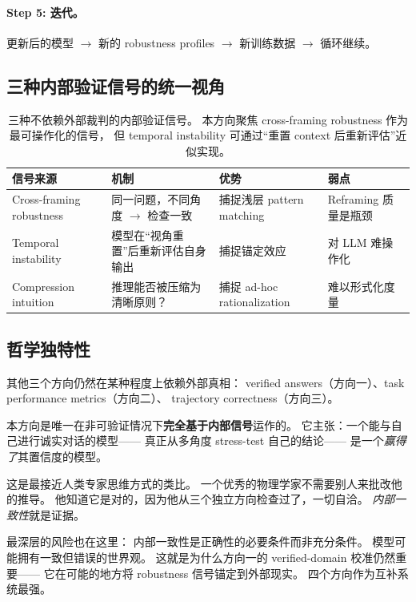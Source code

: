 \documentclass[12pt,a4paper]{article}
\begin{document}
\paragraph{Step 5: 迭代。}
更新后的模型 $\rightarrow$ 新的 robustness profiles
$\rightarrow$ 新训练数据 $\rightarrow$ 循环继续。

\subsection{三种内部验证信号的统一视角}

\begin{table}[h]
\centering
\small
\begin{tabular}{p{3cm}p{4cm}p{2.5cm}p{3cm}}
\toprule
\textbf{信号来源} & \textbf{机制} & \textbf{优势} & \textbf{弱点} \\
\midrule
Cross-framing robustness
  & 同一问题，不同角度 $\rightarrow$ 检查一致
  & 捕捉浅层 pattern matching
  & Reframing 质量是瓶颈 \\
Temporal instability
  & 模型在``视角重置''后重新评估自身输出
  & 捕捉锚定效应
  & 对 LLM 难操作化 \\
Compression intuition
  & 推理能否被压缩为清晰原则？
  & 捕捉 ad-hoc rationalization
  & 难以形式化度量 \\
\bottomrule
\end{tabular}
\caption{三种不依赖外部裁判的内部验证信号。
本方向聚焦 cross-framing robustness 作为最可操作化的信号，
但 temporal instability 可通过``重置 context 后重新评估''近似实现。}
\end{table}

\subsection{哲学独特性}

其他三个方向仍然在某种程度上依赖外部真相：
verified answers（方向一）、task performance metrics（方向二）、
trajectory correctness（方向三）。

本方向是唯一在非可验证情况下\textbf{完全基于内部信号}运作的。
它主张：一个能与自己进行诚实对话的模型——
真正从多角度 stress-test 自己的结论——
是一个\textit{赢得了}其置信度的模型。

这是最接近人类专家思维方式的类比。
一个优秀的物理学家不需要别人来批改他的推导。
他知道它是对的，因为他从三个独立方向检查过了，一切自洽。
\textit{内部一致性}就是证据。

最深层的风险也在这里：
内部一致性是正确性的必要条件而非充分条件。
模型可能拥有一致但错误的世界观。
这就是为什么方向一的 verified-domain 校准仍然重要——
它在可能的地方将 robustness 信号锚定到外部现实。
四个方向作为互补系统最强。
\end{document}
